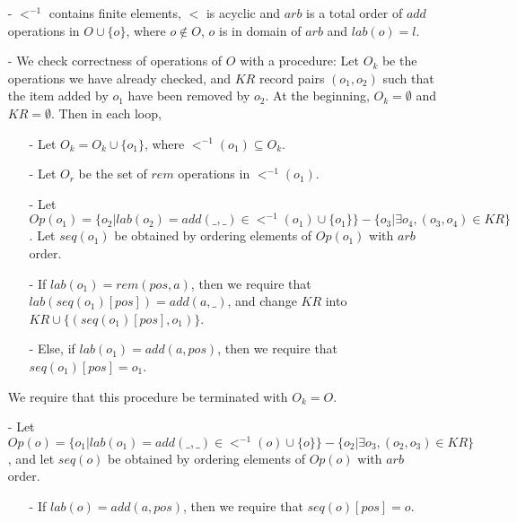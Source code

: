 \begin{itemize}
\setlength{\itemsep}{0.5pt}
\item[-] $<^{-1}$ contains finite elements, $<$ is acyclic and $arb$ is a total order of $add$ operations in $O \cup \{ o \}$, where $o \notin O$, $o$ is in domain of $arb$ and $lab(o)=l$.

\item[-] We check correctness of operations of $O$ with a procedure: Let $O_k$ be the operations we have already checked, and $KR$ record pairs $(o_1,o_2)$ such that the item added by $o_1$ have been removed by $o_2$. At the beginning, $O_k = \emptyset$ and $KR = \emptyset$. Then in each loop, 

    \begin{itemize}
    \setlength{\itemsep}{0.5pt} 
    \item[-] Let $O_k = O_k \cup \{ o_1 \}$, where $<^{-1}(o_1) \subseteq O_k$. 
    
    \item[-] Let $O_r$ be the set of $rem$ operations in $<^{-1}(o_1)$. %

    \item[-] Let $Op(o_1) = \{ o_2 \vert lab(o_2)=add(\_,\_) \in <^{-1}(o_1) \cup \{ o_1 \} \} - \{ o_3 \vert \exists o_4, (o_3,o_4) \in KR \}$. Let $seq(o_1)$ be obtained by ordering elements of $Op(o_1)$ with $arb$ order. 

    \item[-] If $lab(o_1) = rem(pos,a)$, then we require that $lab(seq(o_1)[pos])=add(a,\_)$, and change $KR$ into $KR \cup \{ (seq(o_1)[pos],o_1) \}$. 
    
    \item[-] Else, if $lab(o_1) = add(a,pos)$, then we require that $seq(o_1)[pos] = o_1$. 
    \end{itemize}
    
    We require that this procedure be terminated with $O_k = O$. 

\item[-] {\color {red}Let $Op(o) = \{ o_1 \vert lab(o_1)=add(\_,\_) \in <^{-1}(o) \cup \{ o \} \} - \{ o_2 \vert \exists o_3, (o_2,o_3) \in KR \}$, and let $seq(o)$ be obtained by ordering elements of $Op(o)$ with $arb$ order.} 
    
    \begin{itemize}
    \setlength{\itemsep}{0.5pt}
    \item[-] If $lab(o)=add(a,pos)$, then we require that $seq(o)[pos]=o$. 
    

\end{itemize}
\end{itemize}
